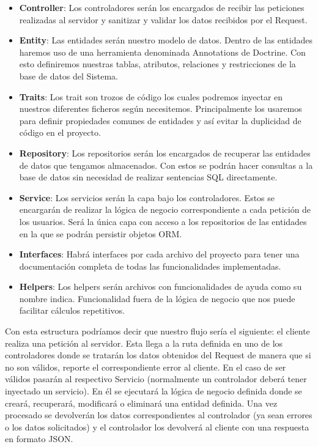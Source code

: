 \begin{itemize}
    \item \textbf{Controller}: Los controladores serán los encargados de recibir las peticiones realizadas al servidor y sanitizar y validar los datos recibidos por el Request.
    \item \textbf{Entity}: Las entidades serán nuestro modelo de datos. Dentro de las entidades haremos uso de una herramienta denominada Annotations de Doctrine. Con esto definiremos nuestras tablas, atributos, relaciones y restricciones de la base de datos del Sistema.
    \item \textbf{Traits}: Los trait son trozos de código los cuales podremos inyectar en nuestros diferentes ficheros según necesitemos. Principalmente los usaremos para definir propiedades comunes de entidades y así evitar la duplicidad de código en el proyecto.
    \item \textbf{Repository}: Los repositorios serán los encargados de recuperar las entidades de datos que tengamos almacenados. Con estos se podrán hacer consultas a la base de datos sin necesidad de realizar sentencias SQL directamente.
    \item \textbf{Service}: Los servicios serán la capa bajo los controladores. Estos se encargarán de realizar la lógica de negocio correspondiente a cada petición de los usuarios. Será la única capa con acceso a los repositorios de las entidades en la que se podrán persistir objetos ORM.
    \item \textbf{Interfaces}: Habrá interfaces por cada archivo del proyecto para tener una documentación completa de todas las funcionalidades implementadas.
    \item \textbf{Helpers}: Los helpers serán archivos con funcionalidades de ayuda como su nombre indica. Funcionalidad fuera de la lógica de negocio que nos puede facilitar cálculos repetitivos.
\end{itemize}

Con esta estructura podríamos decir que nuestro flujo sería el siguiente: el cliente realiza una petición al servidor. Esta llega a la ruta definida en uno de los controladores donde se tratarán los datos obtenidos del Request de manera que si no son válidos, reporte el correspondiente error al cliente. En el caso de ser válidos pasarán al respectivo Servicio (normalmente un controlador deberá tener inyectado un servicio). En él se ejecutará la lógica de negocio definida donde se creará, recuperará, modificará o eliminará una entidad definida. Una vez procesado se devolverán los datos correspondientes al controlador (ya sean errores o los datos solicitados) y el controlador los devolverá al cliente con una respuesta en formato JSON.

